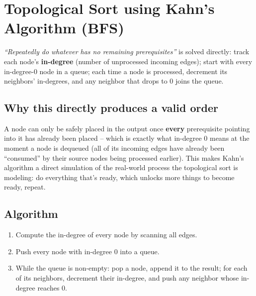 \section{Topological Sort using Kahn's Algorithm (BFS)}
\label{sec:graph-topo-sort-kahn}


\begin{patternbox}
\emph{``Repeatedly do whatever has no remaining prerequisites''} is
solved directly: track each node's \textbf{in-degree} (number of
unprocessed incoming edges); start with every in-degree-$0$ node in a
queue; each time a node is processed, decrement its neighbors'
in-degrees, and any neighbor that drops to $0$ joins the queue.
\end{patternbox}

\subsection*{Why this directly produces a valid order}

A node can only be safely placed in the output once \textbf{every}
prerequisite pointing into it has already been placed -- which is
exactly what in-degree $0$ means at the moment a node is dequeued (all
of its incoming edges have already been ``consumed'' by their source
nodes being processed earlier). This makes Kahn's algorithm a direct
simulation of the real-world process the topological sort is modeling:
do everything that's ready, which unlocks more things to become ready,
repeat.

\subsection*{Algorithm}

\begin{enumerate}
  \item Compute the in-degree of every node by scanning all edges.
  \item Push every node with in-degree $0$ into a queue.
  \item While the queue is non-empty: pop a node, append it to the
        result; for each of its neighbors, decrement their in-degree,
        and push any neighbor whose in-degree reaches $0$.
\end{enumerate}

